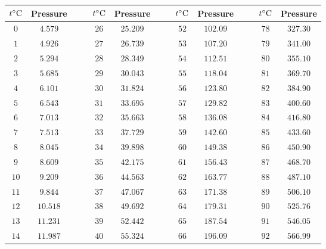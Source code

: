 \begin{tabular}{cccccccccccccc}                                                                        \toprule
${t}^{\circ}\textrm{C}$ & Pressure &&& ${t}^{\circ}\textrm{C}$ & Pressure &&& ${t}^{\circ}\textrm{C}$ & Pressure &&& ${t}^{\circ}\textrm{C}$ & Pressure \\\midrule
$0$           & $4.579$  &&& $26$          & $25.209$ &&& $52$          & $102.09$ &&& $78$          & $327.30$ \\[4pt]
$1$           & $4.926$  &&& $27$          & $26.739$ &&& $53$          & $107.20$ &&& $79$          & $341.00$ \\[4pt]
$2$           & $5.294$  &&& $28$          & $28.349$ &&& $54$          & $112.51$ &&& $80$          & $355.10$ \\[4pt]
$3$           & $5.685$  &&& $29$          & $30.043$ &&& $55$          & $118.04$ &&& $81$          & $369.70$ \\[4pt]
$4$           & $6.101$  &&& $30$          & $31.824$ &&& $56$          & $123.80$ &&& $82$          & $384.90$ \\[4pt]
$5$           & $6.543$  &&& $31$          & $33.695$ &&& $57$          & $129.82$ &&& $83$          & $400.60$ \\[4pt]
$6$           & $7.013$  &&& $32$          & $35.663$ &&& $58$          & $136.08$ &&& $84$          & $416.80$ \\[4pt]
$7$           & $7.513$  &&& $33$          & $37.729$ &&& $59$          & $142.60$ &&& $85$          & $433.60$ \\[4pt]
$8$           & $8.045$  &&& $34$          & $39.898$ &&& $60$          & $149.38$ &&& $86$          & $450.90$ \\[4pt]
$9$           & $8.609$  &&& $35$          & $42.175$ &&& $61$          & $156.43$ &&& $87$          & $468.70$ \\[4pt]
$10$          & $9.209$  &&& $36$          & $44.563$ &&& $62$          & $163.77$ &&& $88$          & $487.10$ \\[4pt]
$11$          & $9.844$  &&& $37$          & $47.067$ &&& $63$          & $171.38$ &&& $89$          & $506.10$ \\[4pt]
$12$          & $10.518$ &&& $38$          & $49.692$ &&& $64$          & $179.31$ &&& $90$          & $525.76$ \\[4pt]
$13$          & $11.231$ &&& $39$          & $52.442$ &&& $65$          & $187.54$ &&& $91$          & $546.05$ \\[4pt]
$14$          & $11.987$ &&& $40$          & $55.324$ &&& $66$          & $196.09$ &&& $92$          & $566.99$ \\[4pt]

\end{tabular}
